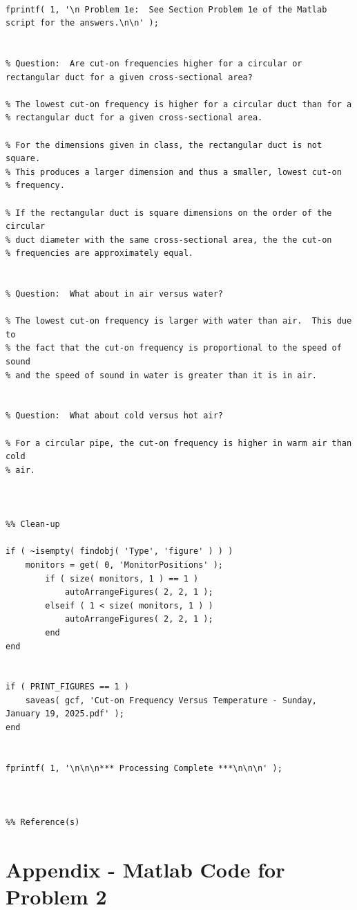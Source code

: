 \begin{lstlisting}[style=Matlab-editor, basicstyle=\fontfamily{pcr}, numbers=none, keepspaces, mlshowsectionrules, basicstyle=\footnotesize]
%% Problem 1e

fprintf( 1, '\n Problem 1e:  See Section Problem 1e of the Matlab script for the answers.\n\n' );


% Question:  Are cut-on frequencies higher for a circular or rectangular duct for a given cross-sectional area?

% The lowest cut-on frequency is higher for a circular duct than for a
% rectangular duct for a given cross-sectional area.

% For the dimensions given in class, the rectangular duct is not square.
% This produces a larger dimension and thus a smaller, lowest cut-on
% frequency.

% If the rectangular duct is square dimensions on the order of the circular
% duct diameter with the same cross-sectional area, the the cut-on
% frequencies are approximately equal.


% Question:  What about in air versus water?

% The lowest cut-on frequency is larger with water than air.  This due to
% the fact that the cut-on frequency is proportional to the speed of sound
% and the speed of sound in water is greater than it is in air.


% Question:  What about cold versus hot air?

% For a circular pipe, the cut-on frequency is higher in warm air than cold
% air.



%% Clean-up

if ( ~isempty( findobj( 'Type', 'figure' ) ) )
    monitors = get( 0, 'MonitorPositions' );
        if ( size( monitors, 1 ) == 1 )
            autoArrangeFigures( 2, 2, 1 );
        elseif ( 1 < size( monitors, 1 ) )
            autoArrangeFigures( 2, 2, 1 );
        end
end


if ( PRINT_FIGURES == 1 )
    saveas( gcf, 'Cut-on Frequency Versus Temperature - Sunday, January 19, 2025.pdf' );
end


fprintf( 1, '\n\n\n*** Processing Complete ***\n\n\n' );



%% Reference(s)
\end{lstlisting}









\newpage
\section{Appendix - Matlab Code for Problem 2}
\label{appendix:problem2}

